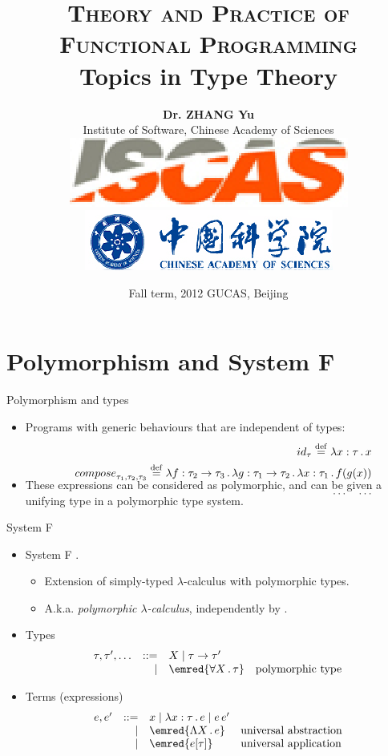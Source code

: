 \documentclass[paper=screen,mode=present,style=zysimple]{powerdot}
\title{{\small \textsc{Theory and Practice of Functional Programming}}
\\[12pt]
{\Large \color{TitleColor} Topics in Type Theory}
}
\author{\small \textbf{Dr. ZHANG Yu}
  \\[2pt] \small Institute of Software, Chinese Academy of Sciences 
  \\[5pt] \includegraphics[height=.04\slideheight]{iscas.eps} 
  \qquad \qquad 
  \includegraphics[height=.04\slideheight]{cas.eps}
}
\date{\scriptsize Fall term, 2012 \qquad GUCAS, Beijing}
\begin{document}
\maketitle 

\section{Polymorphism and System F}

\begin{slide}{Polymorphism and types}
\begin{itemize}
\item Programs with generic behaviours that are independent of types:
\begin{eqnarray*}
&& {id}_{\tau} \stackrel{\mathrm{def}}{=} \lambda x : \tau \, . \, x
\\ && 
{compose}_{\tau_1, \tau_2, \tau_3} \stackrel{\mathrm{def}}{=} 
\lambda f : \tau_2 \to \tau_3 \, . \, \lambda g : \tau_1 \to \tau_2 \, . \, \lambda x : \tau_1 \, . \, f (g (x))
\\ & & 
\ldots \quad \ldots
\\[-3em]
\end{eqnarray*}
\item These expressions can be considered as polymorphic, and can be given a unifying type in a polymorphic type system.
\end{itemize}
\end{slide}

\begin{slide}{System F}
\begin{itemize}
\item System F .
\begin{itemize}
\item Extension of simply-typed $\lambda$-calculus with polymorphic types.
\item A.k.a. {\em polymorphic $\lambda$-calculus}, independently by .
\end{itemize}
\item Types
\[
\begin{array}{lrl@{\quad}l}
\tau, \tau', \ldots & ::= & X \mid \tau \to \tau' & 
\\ 
& \mid & \emred{\forall X \ldot \tau} & \mbox{polymorphic type}
\end{array}
\]
\item Terms (expressions)
\[
\begin{array}{lrl@{\quad}l}
e, e' & ::= & x \mid \lambda x : \tau \ldot e \mid e \, e' 
\\
& \mid & \emred{\Lambda X \ldot e} & \mbox{universal abstraction}
\\
& \mid & \emred{e [\tau]} & \mbox{universal application}
\end{array}
\]
\end{itemize}
\end{slide}
\end{document}
